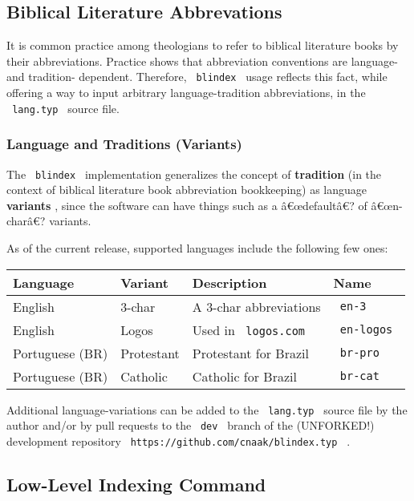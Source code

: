\subsection{Biblical Literature
Abbrevations}\label{biblical-literature-abbrevations}

It is common practice among theologians to refer to biblical literature
books by their abbreviations. Practice shows that abbreviation
conventions are language- and tradition- dependent. Therefore,
\texttt{\ blindex\ } usage reflects this fact, while offering a way to
input arbitrary language-tradition abbreviations, in the
\texttt{\ lang.typ\ } source file.

\subsubsection{Language and Traditions
(Variants)}\label{language-and-traditions-variants}

The \texttt{\ blindex\ } implementation generalizes the concept of
\textbf{tradition} (in the context of biblical literature book
abbreviation bookkeeping) as language \textbf{variants} , since the
software can have things such as a â€œdefaultâ€? of â€œn-charâ€?
variants.

As of the current release, supported languages include the following few
ones:

\begin{longtable}[]{@{}llll@{}}
\toprule\noalign{}
Language & Variant & Description & Name \\
\midrule\noalign{}
\endhead
\bottomrule\noalign{}
\endlastfoot
English & 3-char & A 3-char abbreviations & \texttt{\ en-3\ } \\
English & Logos & Used in \texttt{\ logos.com\ } &
\texttt{\ en-logos\ } \\
Portuguese (BR) & Protestant & Protestant for Brazil &
\texttt{\ br-pro\ } \\
Portuguese (BR) & Catholic & Catholic for Brazil &
\texttt{\ br-cat\ } \\
\end{longtable}

Additional language-variations can be added to the \texttt{\ lang.typ\ }
source file by the author and/or by pull requests to the
\texttt{\ dev\ } branch of the (UNFORKED!) development repository
\texttt{\ https://github.com/cnaak/blindex.typ\ } .

\subsection{Low-Level Indexing
Command}\label{low-level-indexing-command}


